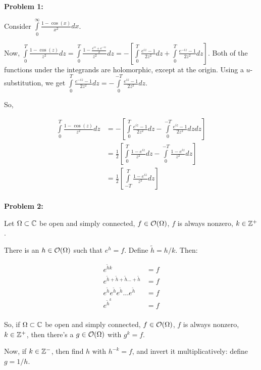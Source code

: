 \documentclass[a4paper,12pt]{article}
\begin{document}
{\bf Problem 1:}

Consider $\int\limits_0^\infty \frac{1-\cos(x)}{x^2} dx$. 

Now, $\int\limits_0^T\frac{1-\cos(z)}{z^2} dz = \int\limits_0^T\frac{1-\frac{e^{iz}+e^{-iz}}{2}}{z^2} dz = -\left[\int\limits_0^T \frac{e^{iz}-1}{2z^2} dz+ \int\limits_0^T \frac{e^{-iz}-1}{2z^2} dz\right]$. Both of the functions under the integrands are holomorphic, except at the origin. Using a $u$-substitution, we get $\int\limits_0^T \frac{e^{-iz}-1}{2z^2} dz = -\int\limits_0^{-T} \frac{e^{iz}-1}{2z^2} dz$.

So, 

\begin{align*}
\int\limits_0^T\frac{1-\cos(z)}{z^2} dz &= -\left[\int\limits_0^T \frac{e^{iz}-1}{2z^2} dz- \int\limits_0^{-T} \frac{e^{iz}-1}{2z^2} dz dz\right]\\
&= \frac{1}{2}\left[\int\limits_0^T \frac{1-e^{iz}}{z^2} dz-\int\limits_0^{-T} \frac{1-e^{iz}}{z^2} dz \right]\\
&= \frac{1}{2}\left[\int\limits_{-T}^T \frac{1-e^{iz}}{z^2} dz \right]\\
\end{align*} %

\shunt

{\bf Problem 2:}

Let $\Omega \subset \mathbb{C}$ be open and simply connected, $f \in \mathcal{O} (\Omega)$, $f$ is always nonzero, $k \in \mathbb{Z}^+$.

There is an $h \in \mathcal{O}(\Omega)$ such that $e^h =f$. Define $\tilde{h} = h/k$. Then:

\begin{align*}
e^{\tilde{h}k} &= f\\
e^{\tilde{h}+\tilde{h}+\tilde{h} \ldots +\tilde{h}} &= f\\
e^{\tilde{h}}e^{\tilde{h}}e^{\tilde{h}} \ldots e^{\tilde{h}} &= f\\
e^{\tilde{h}}^k &= f\\
\end{align*} %

So, if $\Omega \subset \mathbb{C}$ be open and simply connected, $f \in \mathcal{O} (\Omega)$, $f$ is always nonzero, $k \in \mathbb{Z}^+$, then there's a $g \in \mathcal{O}(\Omega)$ with $g^k = f$.

Now, if $k \in \mathbb{Z}^-$, then find $h$ with $h^{-k} = f$, and invert it multiplicatively: define $g = 1/h$. %
\end{document}
